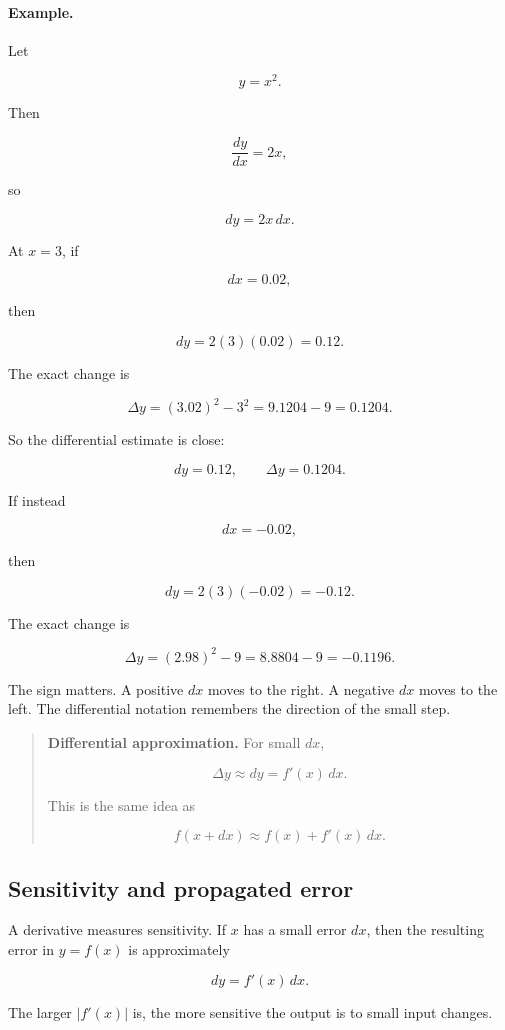 \paragraph{Example.}
Let

\[
y=x^2.
\]

Then

\[
\frac{dy}{dx}=2x,
\]

so

\[
dy=2x\,dx.
\]

At \(x=3\), if

\[
dx=0.02,
\]

then

\[
dy=2(3)(0.02)=0.12.
\]

The exact change is

\[
\Delta y=(3.02)^2-3^2=9.1204-9=0.1204.
\]

So the differential estimate is close:

\[
dy=0.12,
\qquad
\Delta y=0.1204.
\]

If instead

\[
dx=-0.02,
\]

then

\[
dy=2(3)(-0.02)=-0.12.
\]

The exact change is

\[
\Delta y=(2.98)^2-9=8.8804-9=-0.1196.
\]

The sign matters.  A positive \(dx\) moves to the right.  A negative \(dx\) moves to the left.  The differential notation remembers the direction of the small step.

\begin{quote}
\textbf{Differential approximation.}
For small \(dx\),

\[
\boxed{
\Delta y\approx dy=f'(x)\,dx.
}
\]

This is the same idea as

\[
f(x+dx)\approx f(x)+f'(x)\,dx.
\]
\end{quote}

\subsection{Sensitivity and propagated error}
\label{subsec:sensitivity-propagated-error}

A derivative measures sensitivity.  If \(x\) has a small error \(dx\), then the resulting error in \(y=f(x)\) is approximately

\[
dy=f'(x)\,dx.
\]

The larger \(|f'(x)|\) is, the more sensitive the output is to small input changes.


